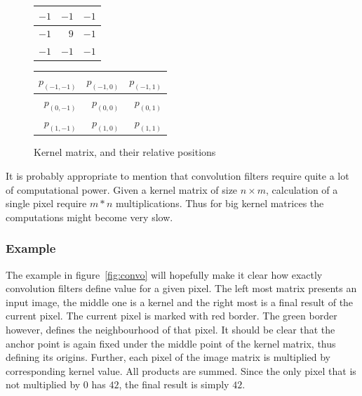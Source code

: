 \documentclass{article}
\begin{document}
%
%
\begin{figure}[H]
  \centering

	\begin{tabular}{| r | r | r |}
	\hline
		$-1$ & $-1$ & $-1$ \\
	\hline
		$-1$ & $9$ & $-1$ \\
	\hline
		$-1$ & $-1$ & $-1$ \\
	\hline

	\end{tabular}

	\begin{tabular}{| r | r | r |}
	\hline
		$p_{(-1,-1)}$ & $p_{(-1,0)}$ & $p_{(-1,1)}$ \\
	\hline
		$p_{(0,-1)}$ & $p_{(0,0)}$ & $p_{(0,1)}$ \\
	\hline
		$p_{(1,-1)}$ & $p_{(1,0)}$ & $p_{(1,1)}$ \\
	\hline

	\end{tabular}
  
  {
  \caption{Kernel matrix, and their relative positions}
  \label{fig:anchor}
  }

\end{figure}



It is probably appropriate to mention that convolution filters require quite a lot of computational power. Given a kernel matrix of size $n \times m$, calculation of a single pixel require $m*n$ multiplications. Thus for big kernel matrices the computations might become very slow.

\subsubsection{Example}

The example in figure~\ref{fig:convo} will hopefully make it clear how exactly convolution filters define value for a given pixel. The left most matrix presents an input image, the middle one is a kernel and the right most is a final result of the current pixel. The current pixel is marked with red border. The green border however, defines the neighbourhood of that pixel. It should be clear that the anchor point is again fixed under the middle point of the kernel matrix, thus defining its origins. Further, each pixel of the image matrix is multiplied by corresponding kernel value. All products are summed. Since the only pixel that is not multiplied by $0$ has $42$, the final result is simply $42$.
\end{document}
